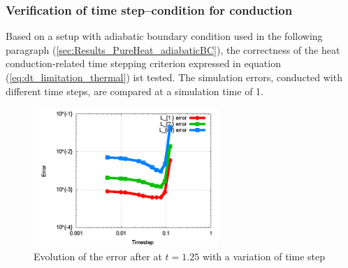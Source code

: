 \documentclass{report}
\begin{document}
\subsubsection{Verification of time step--condition for conduction}

Based on a setup with adiabatic boundary condition used in the following paragraph (\ref{sec:Results_PureHeat_adiabaticBC}), the correctness of the
heat conduction-related time stepping criterion expressed in equation (\ref{eq:dt_limitation_thermal}) ist tested. The simulation errors, conducted with different time steps, are compared at a simulation time of 1. 


\begin{figure}[h]  
  \label{fig:PureHeat_dtVerification}
  \centering
  \includegraphics[width=7cm]{Graphics/results/PureHeatConduction/ErrorTimestep}
  \caption{Evolution of the error after at $t=1.25$ with a variation of time step}
\end{figure}
\end{document}
